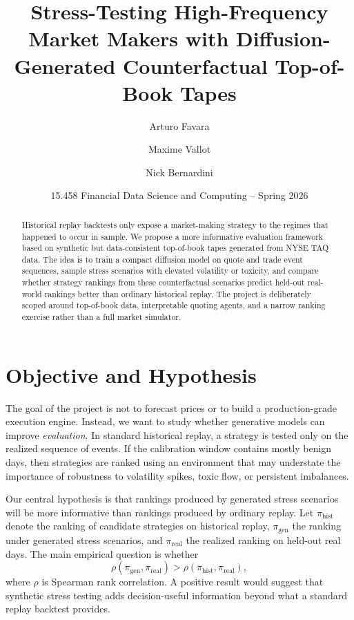 \documentclass[10pt,letterpaper,twocolumn]{article}
\title{\textbf{Stress-Testing High-Frequency Market Makers with Diffusion-Generated Counterfactual Top-of-Book Tapes}}
\author{Arturo Favara \and Maxime Vallot \and Nick Bernardini}
\date{15.458 Financial Data Science and Computing \;--\; Spring 2026}
\begin{document}
\maketitle

\begin{abstract}
Historical replay backtests only expose a market-making strategy to the regimes that happened to occur in sample. We propose a more informative evaluation framework based on synthetic but data-consistent top-of-book tapes generated from NYSE TAQ data. The idea is to train a compact diffusion model on quote and trade event sequences, sample stress scenarios with elevated volatility or toxicity, and compare whether strategy rankings from these counterfactual scenarios predict held-out real-world rankings better than ordinary historical replay. The project is deliberately scoped around top-of-book data, interpretable quoting agents, and a narrow ranking exercise rather than a full market simulator.
\end{abstract}

\section{Objective and Hypothesis}

The goal of the project is not to forecast prices or to build a production-grade execution engine. Instead, we want to study whether generative models can improve \emph{evaluation}. In standard historical replay, a strategy is tested only on the realized sequence of events. If the calibration window contains mostly benign days, then strategies are ranked using an environment that may understate the importance of robustness to volatility spikes, toxic flow, or persistent imbalances.

Our central hypothesis is that rankings produced by generated stress scenarios will be more informative than rankings produced by ordinary replay. Let $\pi_{\mathrm{hist}}$ denote the ranking of candidate strategies on historical replay, $\pi_{\mathrm{gen}}$ the ranking under generated stress scenarios, and $\pi_{\mathrm{real}}$ the realized ranking on held-out real days. The main empirical question is whether
\[
\rho\!\left(\pi_{\mathrm{gen}},\pi_{\mathrm{real}}\right)
>
\rho\!\left(\pi_{\mathrm{hist}},\pi_{\mathrm{real}}\right),
\]
where $\rho$ is Spearman rank correlation. A positive result would suggest that synthetic stress testing adds decision-useful information beyond what a standard replay backtest provides.
\end{document}
